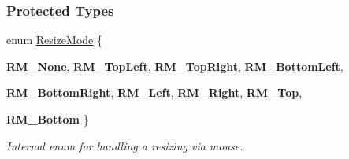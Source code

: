 \subsubsection*{Protected Types}
\begin{DoxyCompactItemize}
\item 
enum \hyperlink{classMezzanine_1_1UI_1_1Window_af42e3712bea229089f8c7ccae8bd53f2}{ResizeMode} \{ \par
{\bfseries RM\_\-None}, 
{\bfseries RM\_\-TopLeft}, 
{\bfseries RM\_\-TopRight}, 
{\bfseries RM\_\-BottomLeft}, 
\par
{\bfseries RM\_\-BottomRight}, 
{\bfseries RM\_\-Left}, 
{\bfseries RM\_\-Right}, 
{\bfseries RM\_\-Top}, 
\par
{\bfseries RM\_\-Bottom}
 \}
\begin{DoxyCompactList}\small\item\em Internal enum for handling a resizing via mouse. \item\end{DoxyCompactList}\end{DoxyCompactItemize}

